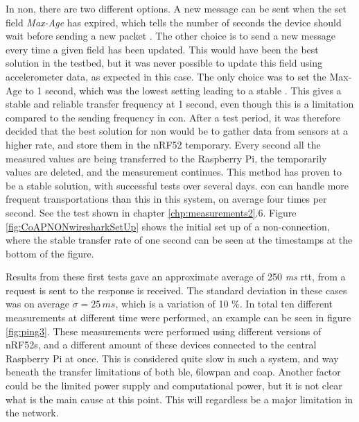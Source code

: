 \noindent In \gls{non}, there are two different options. A new message can be sent when the set field \textit{Max-Age} has expired, which tells the number of seconds the device should wait before sending a new packet \cite{shelby2014constrained}. The other choice is to send a new message every time a given field has been updated. This would have been the best solution in the testbed, but it was never possible to update this field using accelerometer data, as expected in this case. The only choice was to set the Max-Age to 1 second, which was the lowest setting leading to a stable . This gives a stable and reliable transfer frequency at 1 second, even though this is a limitation compared to the sending frequency in \gls{con}. After a test period, it was therefore decided that the best solution for \gls{non} would be to gather data from sensors at a higher rate, and store them in the \gls{nRF52} temporary. Every second all the measured values are being transferred to the \gls{Raspberry Pi}, the temporarily values are deleted, and the measurement continues. This method has proven to be a stable solution, with successful tests over several days. \gls{con} can handle more frequent transportations than this in this system, on average four times per second. See the test shown in chapter \ref{chp:measurements2}.6. Figure  \ref{fig:CoAPNONwiresharkSetUp} shows the initial set up of a \gls{non}-connection, where the stable transfer rate of one second can be seen at the timestamps at the bottom of the figure. 





\noindent Results from these first tests gave an approximate average of 250 \textit{ms} \gls{rtt}, from a request is sent to the response is received. The standard deviation in these cases was on average $ \sigma = 25 \, ms $, which is a variation of 10 \%. In total ten different measurements at different time were performed, an example can be seen in figure \ref{fig:ping3}. These measurements were performed using different versions of \glspl{nRF52}, and a different amount of these devices connected to the central Raspberry Pi at once. This is considered quite slow in such a system, and way beneath the transfer limitations of both \gls{ble}, \gls{6lowpan} and \gls{coap}. Another factor could be the limited power supply and computational power, but it is not clear what is the main cause at this point. This will regardless be a major limitation in the network.

